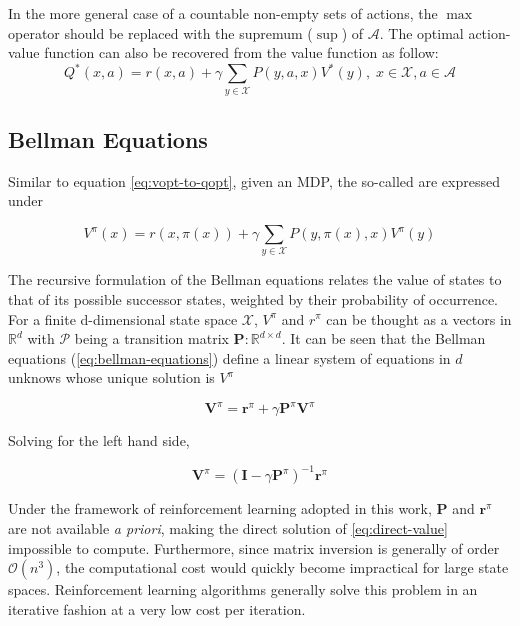 In the more general case of a countable non-empty sets of actions, the $\max$
operator should be replaced with the supremum ($\sup$) of $\mathcal{A}$. The
optimal action-value function can also be recovered from the value function as
follow:
\begin{equation}
Q^*(x,a) = r(x,a) + \gamma \sum_{y \in \mathcal{X}} P(y, a, x) V^*(y), \; x \in
\mathcal{X}, a \in \mathcal{A} \label{eq:vopt-to-qopt}
\end{equation}

\subsection{Bellman Equations}
Similar to equation \ref{eq:vopt-to-qopt}, given an MDP, the  so-called 
 are expressed under

\begin{equation}
V^\pi(x) = r(x, \pi(x)) + \gamma \sum_{y \in \mathcal{X}} P(y, \pi(x), x) V^\pi(y)
\label{eq:bellman-equations}
\end{equation}

The recursive formulation of the Bellman equations relates the value of states
to that of its possible successor states, weighted by their probability of occurrence. For a finite d-dimensional state space $\mathcal{X}$, $V^\pi$ and
$r^\pi$ can be thought as a vectors in $\mathbb{R}^d$ with $\mathcal{P}$ being a
transition matrix $\mathbf{P}: \mathbb{R}^{d \times d}$. It can be seen that the
Bellman equations (\ref{eq:bellman-equations}) define a linear system of equations in
$d$ unknows whose unique solution is $V^\pi$

\begin{equation}
\mathbf{V}^\pi = \mathbf{r}^\pi + \gamma \mathbf{P}^\pi \mathbf{V}^\pi
\end{equation}

Solving for the left hand side, 

\begin{equation}
\mathbf{V}^\pi = (\mathbf{I} - \gamma \mathbf{P}^\pi)^{-1} \mathbf{r}^\pi
\label{eq:direct-value}
\end{equation}

Under the framework of reinforcement learning adopted in this work,
$\mathbf{P}$ and $\mathbf{r}^\pi$ are not available \textit{a priori}, making the
direct solution of \ref{eq:direct-value} impossible to compute. Furthermore, since
matrix inversion is generally of order $\mathcal{O}(n^3)$, the computational
cost would quickly become impractical for large state spaces. Reinforcement learning algorithms generally solve this problem in an iterative fashion at a very low cost per iteration.

